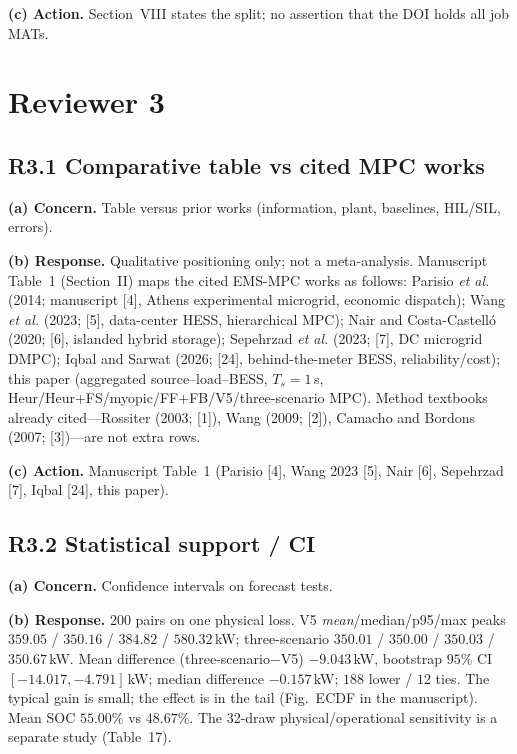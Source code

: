 \documentclass[11pt]{article}
\begin{document}
\textbf{(c) Action.} Section~VIII states the split; no assertion that the DOI holds all job MATs.

\section*{Reviewer 3}

\subsection*{R3.1 Comparative table vs cited MPC works}
\textbf{(a) Concern.} Table versus prior works (information, plant, baselines, HIL/SIL, errors).

\textbf{(b) Response.} Qualitative positioning only; not a meta-analysis. Manuscript Table~1 (Section~II) maps the cited EMS-MPC works as follows: Parisio \emph{et al.} (2014; manuscript [4], Athens experimental microgrid, economic dispatch); Wang \emph{et al.} (2023; [5], data-center HESS, hierarchical MPC); Nair and Costa-Castell{\'o} (2020; [6], islanded hybrid storage); Sepehrzad \emph{et al.} (2023; [7], DC microgrid DMPC); Iqbal and Sarwat (2026; [24], behind-the-meter BESS, reliability/cost); this paper (aggregated source--load--BESS, $T_s=1$\,s, Heur/Heur+FS/myopic/FF+FB/V5/three-scenario MPC). Method textbooks already cited---Rossiter (2003; [1]), Wang (2009; [2]), Camacho and Bordons (2007; [3])---are not extra rows.

\textbf{(c) Action.} Manuscript Table~1 (Parisio [4], Wang 2023 [5], Nair [6], Sepehrzad [7], Iqbal [24], this paper).

\subsection*{R3.2 Statistical support / CI}
\textbf{(a) Concern.} Confidence intervals on forecast tests.

\textbf{(b) Response.} 200 pairs on one physical loss. V5 \emph{mean}/median/p95/max peaks $359.05$ / $350.16$ / $384.82$ / $580.32$\,kW; three-scenario $350.01$ / $350.00$ / $350.03$ / $350.67$\,kW. Mean difference (three-scenario$-$V5) $-9.043$\,kW, bootstrap $95\%$ CI $[-14.017,-4.791]$\,kW; median difference $-0.157$\,kW; $188$ lower / $12$ ties. The typical gain is small; the effect is in the tail (Fig.~ECDF in the manuscript). Mean SOC $55.00\%$ vs $48.67\%$. The 32-draw physical/operational sensitivity is a separate study (Table~17).
\end{document}
